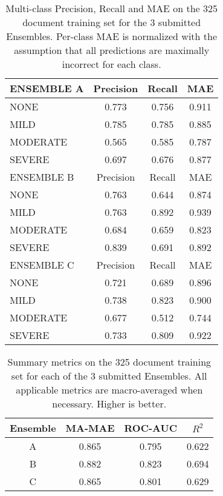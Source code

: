 \begin{table}
\centering
    \begin{tabular}{|l|c|c|c|}
    \hline
   \textsf{\cellcolor{gray!15} ENSEMBLE A} & \textsf{Precision} & \textsf{Recall} & \textsf{MAE} \\ 
   \hline
    \textsf{NONE} & 0.773 & 0.756 & \cellcolor{gray!15} 0.911 \\ 
    \textsf{MILD} & \cellcolor{gray!15} 0.785 & \cellcolor{gray!15} 0.785 & 0.885 \\ 
    \textsf{MODERATE} & 0.565 & 0.585 & 0.787 \\ 
    \textsf{SEVERE} & 0.697 & 0.676 & 0.877 \\ 
   \hline
   \textsf{\cellcolor{gray!15} ENSEMBLE B} & \textsf{Precision} & \textsf{Recall} & \textsf{MAE} \\ 
   \hline
    \textsf{NONE} & 0.763 & 0.644 & 0.874 \\ 
    \textsf{MILD} & 0.763 & \cellcolor{gray!15} 0.892 & \cellcolor{gray!15} 0.939 \\ 
    \textsf{MODERATE} & 0.684 & 0.659 & 0.823 \\ 
    \textsf{SEVERE} & \cellcolor{gray!15} 0.839 & 0.691 & 0.892 \\ 
   \hline
   \textsf{\cellcolor{gray!15} ENSEMBLE C} & \textsf{Precision} & \textsf{Recall} & \textsf{MAE} \\ 
   \hline
    \textsf{NONE} & 0.721 & 0.689 & 0.896 \\ 
    \textsf{MILD} & \cellcolor{gray!15} 0.738 & \cellcolor{gray!15}  0.823 & 0.900 \\ 
    \textsf{MODERATE} & 0.677 & 0.512 & 0.744 \\ 
    \textsf{SEVERE} & 0.733 & 0.809 & \cellcolor{gray!15} 0.922 \\ 
    \hline
    \end{tabular}
    \caption{Multi-class Precision, Recall and MAE on the 325 document training set for the 3 submitted Ensembles. Per-class MAE is normalized with the assumption that all predictions are maximally incorrect for each class.}
    \label{tab:EnsembleTrainingMetrics}
\end{table}

\begin{table}
\centering
    \begin{tabular}{|c|c|c|c|}
         \hline
         \textsf{ Ensemble } & \textsf{ MA-MAE } & \textsf{ ROC-AUC } & \textsf{ $R^2$ } \\
         \hline
         \textsf{ \cellcolor{gray!15} A } & 0.865 & 0.795 & 0.622  \\
         \textsf{ \cellcolor{gray!15} B } & \cellcolor{gray!15} 0.882 & \cellcolor{gray!15} 0.823 & \cellcolor{gray!15} 0.694  \\ 
         \textsf{ \cellcolor{gray!15} C } & 0.865 & 0.801 & 0.629  \\ 
         \hline
    \end{tabular}
    \caption{Summary metrics on the 325 document training set for each of the 3 submitted Ensembles. All applicable metrics are macro-averaged when necessary. Higher is better.}
    \label{tab:EnsembleTrainingMAMetrics1}
\end{table}

